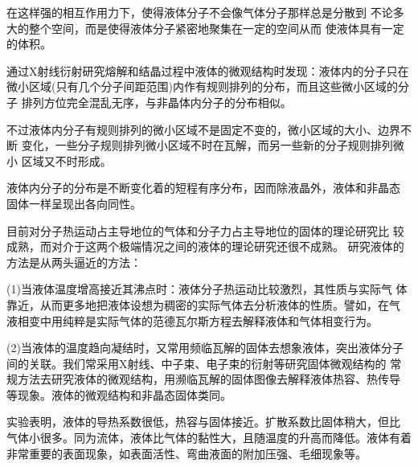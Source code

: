 在这样强的相互作用力下，使得液体分子不会像气体分子那样总是分散到
不论多大的整个空间，而是使得液体分子紧密地聚集在一定的空间从而
使液体具有一定的体积。

通过X射线衍射研究熔解和结晶过程中液体的微观结构时发现：液体内的分子只在
微小区域(只有几个分子间距范围)内作有规则排列的分布，而且这些微小区域的分子
排列方位完全混乱无序，与非晶体内分子的分布相似。

不过液体内分子有规则排列的微小区域不是固定不变的，微小区域的大小、边界不断
变化，一些分子规则排列微小区域不时在瓦解，而另一些新的分子规则排列微小
区域又不时形成。

液体内分子的分布是不断变化着的短程有序分布，因而除液晶外，液体和非晶态
固体一样呈现出各向同性。

目前对分子热运动占主导地位的气体和分子力占主导地位的固体的理论研究比
较成熟，而对介于这两个极端情况之间的液体的理论研究还很不成熟。
研究液体的方法是从两头逼近的方法：

(1)当液体温度增高接近其沸点时：液体分子热运动比较激烈，其性质与实际气
体靠近，从而更多地把液体设想为稠密的实际气体去分析液体的性质。譬如，在气
液相变中用纯粹是实际气体的范德瓦尔斯方程去解释液体和气体相变行为。

(2)当液体的温度趋向凝结时，又常用频临瓦解的固体去想象液体，突出液体分子
间的关联。我们常采用X射线、中子束、电子束的衍射等研究固体微观结构的
常规方法去研究液体的微观结构，用濒临瓦解的固体图像去解释液体热容、热传导 
等现象。液体的微观结构和非晶态固体类同。

实验表明，液体的导热系数很低，热容与固体接近。扩散系数比固体稍大，但比
气体小很多。同为流体，液体比气体的黏性大，且随温度的升高而降低。液体有着 
非常重要的表面现象，如表面活性、弯曲液面的附加压强、毛细现象等。
